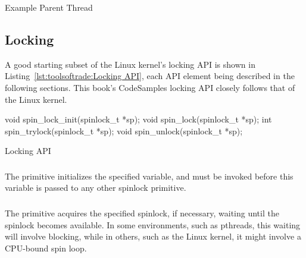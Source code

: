 \begin{listing}[tbp]

\caption{Example Parent Thread}
\label{lst:toolsoftrade:Example Parent Thread}
\end{listing}

\QuickQuizEnd

\subsection{Locking}
\label{sec:toolsoftrade:Locking}

A good starting subset of the Linux kernel's locking API is shown in
Listing~\ref{lst:toolsoftrade:Locking API},
each API element being described in the following sections.
This book's CodeSamples locking API closely follows that of the Linux kernel.

\begin{listing}[tbp]
\begin{VerbatimL}[numbers=none]
void spin_lock_init(spinlock_t *sp);
void spin_lock(spinlock_t *sp);
int spin_trylock(spinlock_t *sp);
void spin_unlock(spinlock_t *sp);
\end{VerbatimL}
\caption{Locking API}
\label{lst:toolsoftrade:Locking API}
\end{listing}

\subsubsection{}

The  primitive initializes the specified
 variable, and must be invoked before
this variable is passed to any other spinlock primitive.

\subsubsection{}

The  primitive acquires the specified spinlock,
if necessary, waiting until the spinlock becomes available.
In some environments, such as pthreads, this waiting will involve
blocking, while in others, such as the Linux kernel, it might involve
a CPU-bound spin loop.

